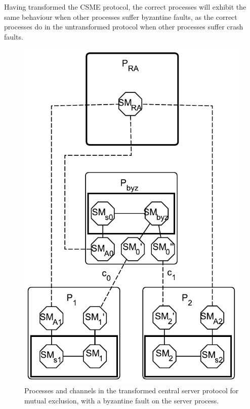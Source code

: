 \documentclass{article}
\begin{document}
		Having transformed the CSME protocol, the correct processes will exhibit the same behaviour when other processes suffer byzantine faults, as the correct processes do in the untransformed protocol when other processes suffer crash faults.

		\begin{figure}[ht]
			\center
			\includegraphics[scale=0.6]{figures/state-machines/CSME-protocol-transformed-byzantine.pdf}
			\caption{Processes and channels in the transformed central server protocol for mutual exclusion, with a byzantine fault on the server process.}
			\label{fig:CSME-protocol-transformed-byzantine}
		\end{figure}
		\FloatBarrier
\end{document}
